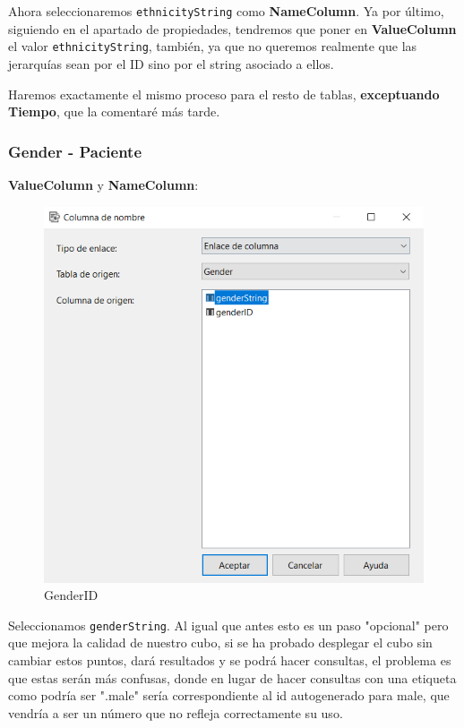\documentclass[12pt, a4paper, twoside]{article}
\begin{document}
Ahora seleccionaremos \texttt{ethnicityString} como \textbf{NameColumn}. Ya por último, siguiendo en el apartado de propiedades, tendremos que poner en \textbf{ValueColumn} el valor \texttt{ethnicityString}, también, ya que no queremos realmente que las jerarquías sean por el ID sino por el string asociado a ellos.

Haremos exactamente el mismo proceso para el resto de tablas, \textbf{exceptuando Tiempo}, que la comentaré más tarde.

\subsubsection{Gender - Paciente}

\textbf{ValueColumn} y \textbf{NameColumn}:

\begin{figure}[H]
	\centering
	\includegraphics[width=1\textwidth]{image/GenderID}
	\caption{GenderID}
	\label{fig:14}
\end{figure}

Seleccionamos \texttt{genderString}. Al igual que antes esto es un paso "opcional" pero que mejora la calidad de nuestro cubo, si se ha probado desplegar el cubo sin cambiar estos puntos, dará resultados y se podrá hacer consultas, el problema es que estas serán más confusas, donde en lugar de hacer consultas con una etiqueta como podría ser ".male" sería correspondiente al id autogenerado para male, que vendría a ser un número que no refleja correctamente su uso.
\end{document}
